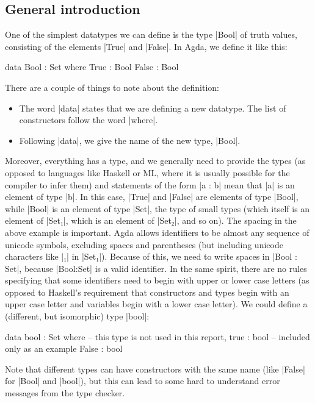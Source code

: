 \subsection{General introduction}
\label{General-intro}
One of the simplest datatypes we can define is the type |Bool| of truth values, consisting of the elements |True| and |False|. In Agda, we define it like this:
\begin{code}
data Bool : Set where
  True   : Bool
  False  : Bool
\end{code}
There are a couple of things to note about the definition:
\begin{itemize}
\item The word |data| states that we are defining a new datatype. The list of constructors follow the word |where|. 
\item Following |data|, we give the name of the new type, |Bool|.
\end{itemize}
Moreover, everything has a type, and we generally need to provide the types (as opposed to languages like Haskell or ML, where it is usually possible for the compiler to infer them) and statements of the form |a : b| mean that |a| is an element of type |b|. In this case, |True| and |False| are elements of type |Bool|, while |Bool| is an element of type |Set|, the type of small types (which itself is an element of |Set₁|, which is an element of |Set₂|, and so on).
The spacing in the above example is important. Agda allows identifiers to be almost any sequence of unicode symbols, excluding spaces and parentheses (but including unicode characters like |₁| in |Set₁|). Because of this, we need to write spaces in |Bool : Set|, because |Bool:Set| is a valid identifier. In the same spirit, there are no rules specifying that some identifiers need to begin with upper or lower case letters (as opposed to Haskell's requirement that constructors and types begin with an upper case letter and variables begin with a lower case letter). We could define a (different, but isomorphic) type |bool|:
\begin{code}
data bool : Set where   -- this type is not used in this report,
  true   : bool         -- included only as an example
  False  : bool
\end{code}
Note that different types can have constructors with the same name (like |False| for |Bool| and |bool|), but this can lead to some hard to understand error messages from the type checker.

